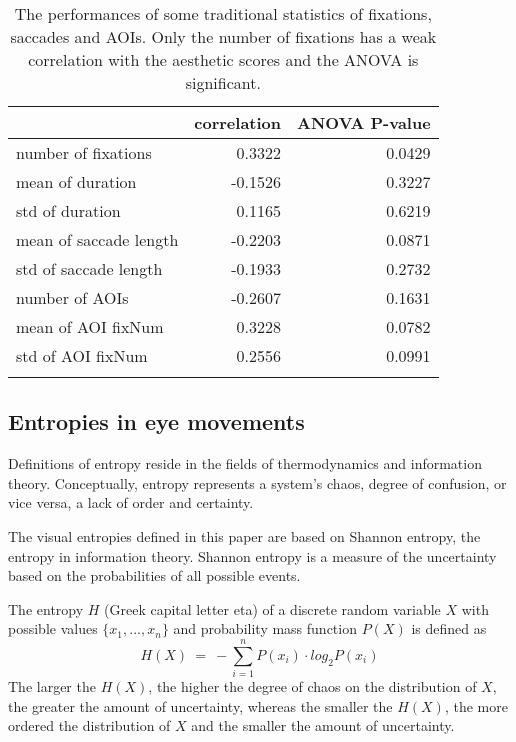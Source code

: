 \begin{table}[H]
  \centering
  \begin{tabular}{lrr}
     &correlation & ANOVA P-value \\
    \hline
    number of fixations & 0.3322 & 0.0429 \\
    mean of duration & -0.1526 & 0.3227 \\
    std of duration & 0.1165 & 0.6219 \\
    mean of saccade length & -0.2203 & 0.0871 \\
    std of saccade length & -0.1933 & 0.2732 \\
    number of AOIs & -0.2607 & 0.1631 \\
    mean of AOI fixNum & 0.3228 & 0.0782 \\
    std of AOI fixNum & 0.2556 & 0.0991 \\
    \\
  \end{tabular}
  \caption{The performances of some traditional statistics of fixations, saccades and AOIs. Only the number of fixations has a weak correlation with the aesthetic scores and the ANOVA is significant.}
  \label{tab:traditional}
\end{table}

\subsection{Entropies in eye movements}
Definitions of entropy reside in the fields of thermodynamics and information theory. Conceptually, entropy represents a system's chaos, degree of confusion, or vice versa, a lack of order and certainty.

The visual entropies defined in this paper are based on Shannon entropy, the entropy in information theory. Shannon entropy is a measure of the uncertainty based on the probabilities of all possible events.

The entropy $H$ (Greek capital letter eta) of a discrete random variable $X$ with possible values $\{x_1, ..., x_n\}$ and probability mass function $P(X)$ is defined as
$$H(X)~=~-\sum_{i=1}^n P(x_i)\cdot log_{2}P(x_i)$$
The larger the $H(X)$, the higher the degree of chaos on the distribution of $X$, the greater the amount of uncertainty, whereas the smaller the $H(X)$, the more ordered the distribution of $X$ and the smaller the amount of uncertainty.

